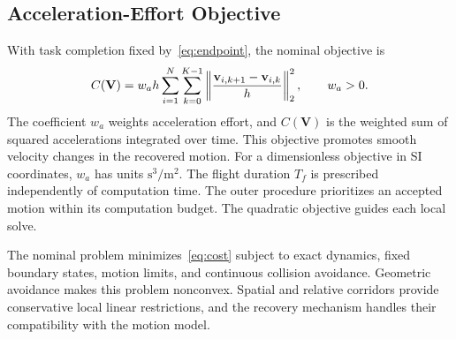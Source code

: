\subsection{Acceleration-Effort Objective}
With task completion fixed by~\eqref{eq:endpoint}, the nominal objective is
\begin{equation}
 C(\mathbf V)=w_a h\sum_{i=1}^N\sum_{k=0}^{K-1}
 \left\|\frac{\mathbf{v}_{i,k+1}-\mathbf{v}_{i,k}}h\right\|_2^2,\qquad w_a>0.
 \label{eq:cost}
\end{equation}
The coefficient $w_a$ weights acceleration effort, and $C(\mathbf V)$ is the weighted sum of squared accelerations integrated over time. This objective promotes smooth velocity changes in the recovered motion. For a dimensionless objective in SI coordinates, $w_a$ has units $\mathrm{s}^3/\mathrm{m}^2$. The flight duration $T_f$ is prescribed independently of computation time. The outer procedure prioritizes an accepted motion within its computation budget. The quadratic objective guides each local solve.

The nominal problem minimizes~\eqref{eq:cost} subject to exact dynamics, fixed boundary states, motion limits, and continuous collision avoidance. Geometric avoidance makes this problem nonconvex. Spatial and relative corridors provide conservative local linear restrictions, and the recovery mechanism handles their compatibility with the motion model.
